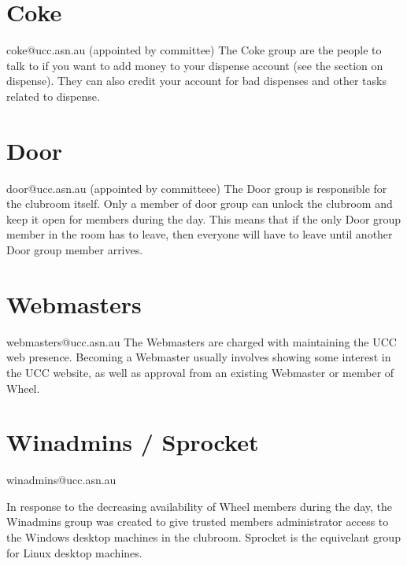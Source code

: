 \section{Coke}
coke@ucc.asn.au
(appointed by committee)
The Coke group are the people to talk to if you want to add money to your dispense account (see the section on dispense). They can also credit your account for bad dispenses and other tasks related to dispense.

\section{Door}
door@ucc.asn.au
(appointed by committeee)
The Door group is responsible for the clubroom itself. Only a member of door group can unlock the clubroom and keep it open for members during the day. This means that if the only Door group member in the room has to leave, then everyone will have to leave until another Door group member arrives.

\section{Webmasters}
webmasters@ucc.asn.au
The Webmasters are charged with maintaining the UCC web presence. Becoming a Webmaster usually involves showing some interest in the UCC website, as well as approval from an existing Webmaster or member of Wheel.

\section{Winadmins / Sprocket}
winadmins@ucc.asn.au

In response to the decreasing availability of Wheel members during the day, the Winadmins group was created to give trusted members administrator access to the Windows desktop machines in the clubroom. Sprocket is the equivelant group for Linux desktop machines.







